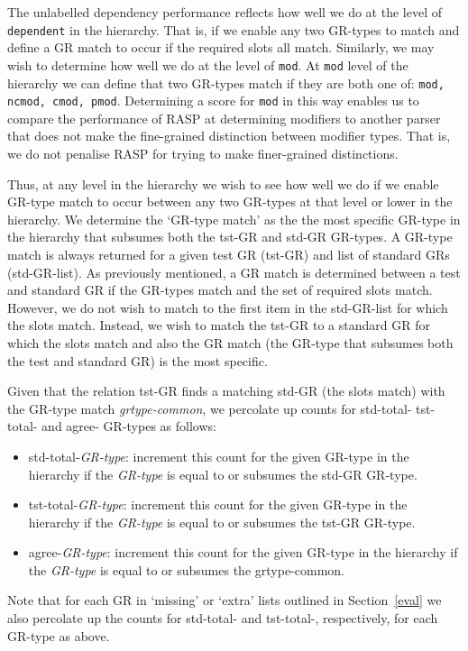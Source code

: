\documentclass[10pt]{article}
\newcommand{\stt}[1]{{\small\texttt{#1}}}
\begin{document}
The unlabelled dependency performance reflects how well we
do at the level of \stt{dependent} in the hierarchy. That is,
if we enable any two GR-types to match and define a GR match
to occur if the required slots all match. 
Similarly, we may wish to determine how well we do 
at the level of \stt{mod}.
At \stt{mod} level of the hierarchy we can define that
two GR-types match if they are both one of: \stt{mod, ncmod,
cmod, pmod}. Determining a score for \stt{mod} in this way
enables us to compare the performance of RASP at determining
modifiers to another parser that does not make the fine-grained
distinction between modifier types. That is, we do not penalise
RASP for trying to make finer-grained distinctions.

Thus, at any level in the hierarchy we wish
to see how well we do if we enable GR-type match to occur between
any two GR-types at that level or lower in the hierarchy.
We determine the `GR-type match' as the 
the most specific GR-type in the hierarchy
that subsumes both the tst-GR and std-GR GR-types. 
A GR-type match is always returned for a given test GR (tst-GR) 
and list of standard GRs (std-GR-list). 
As previously mentioned, a GR match is determined between a test
and standard GR if the GR-types match and the set of required
slots match.
However, we do not wish to match to the first item in the std-GR-list
for which the slots match. Instead, we wish to match the tst-GR
to a standard GR for which the slots match and also the GR match 
(the GR-type that subsumes both the test
and standard GR) is the most specific.

Given that the relation tst-GR finds a matching std-GR 
(the slots match) with the GR-type match \emph{grtype-common},
we percolate up counts for std-total- tst-total- and agree-
GR-types as follows:
\begin{itemize}
\item std-total-\emph{GR-type}: increment this count for 
the given GR-type in the hierarchy if the \emph{GR-type}
is equal to or subsumes the std-GR GR-type. 
\item tst-total-\emph{GR-type}: increment this count for 
the given GR-type in the hierarchy if the \emph{GR-type}
is equal to or subsumes the tst-GR GR-type.
\item agree-\emph{GR-type}: increment this count for 
the given GR-type in the hierarchy if the \emph{GR-type}
is equal to or subsumes the grtype-common.
\end{itemize}

Note that for each GR in `missing' or `extra' lists outlined
in Section~\ref{eval} we also percolate up the counts for
std-total- and tst-total-, respectively, 
for each GR-type as above.
\end{document}
